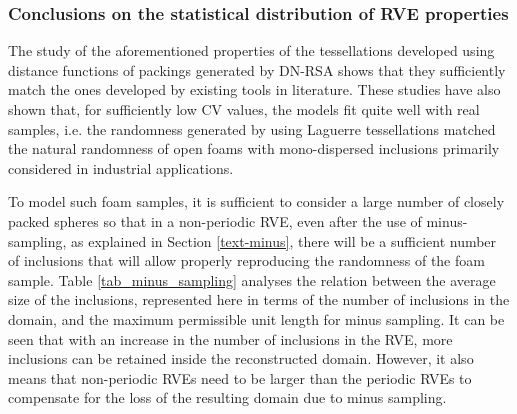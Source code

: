
\subsubsection{Conclusions on the statistical distribution of RVE properties}
The study of the aforementioned properties of the tessellations developed using distance functions of packings generated by DN-RSA shows that they sufficiently match the ones developed by existing tools in literature. These studies have also shown that, for sufficiently low CV values, the models fit quite well with real samples, i.e. the randomness generated by using Laguerre tessellations matched the natural randomness of open foams with mono-dispersed inclusions primarily considered in industrial applications. 

To model such foam samples, it is sufficient to consider a large number of closely packed spheres so that in a non-periodic RVE, even after the use of minus-sampling, as explained in Section \ref{text-minus}, 
there will be a sufficient number of inclusions that will allow properly reproducing the randomness of the foam sample. Table \ref{tab_minus_sampling} analyses the relation between the average size of the inclusions, represented here in terms of the number of inclusions in the domain, and the maximum permissible unit length for minus sampling. It can be seen that with an increase in the number of inclusions in the RVE, more inclusions can be retained inside the reconstructed domain. However, it also means that non-periodic RVEs need to be larger than the periodic RVEs to compensate for the loss of the resulting domain due to minus sampling.



